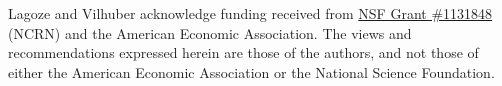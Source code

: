 Lagoze and Vilhuber acknowledge funding received from \href{http://www.nsf.gov/awardsearch/showAward.do?AwardNumber=1131848}{NSF Grant \#1131848} (NCRN) and the American Economic Association. The views and recommendations expressed herein are those of the authors, and not those of either the American Economic Association or the National Science Foundation.